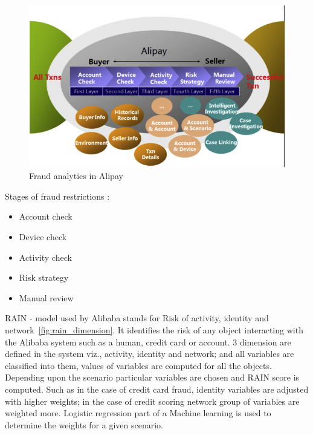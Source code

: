 \begin{figure}[H]
	\includegraphics[scale = 0.8]{figures/alipay.jpg}
	\centering
	\caption{Fraud analytics in Alipay}
	\label{fig:alipay}
\end{figure}

Stages of fraud restrictions :
\begin{itemize}
	\item Account check
	\item Device check
	\item Activity check
	\item Risk strategy 
	\item Manual review
\end{itemize}

RAIN - model used by Alibaba stands for Risk of activity, identity and network~\ref{fig:rain_dimension}. It identifies the risk of any object interacting with the Alibaba system such as a human, credit card or account. 3 dimension are defined in the system viz., activity, identity and network; and all variables are classified into them, values of variables are computed for all the objects. Depending upon the scenario particular variables are chosen and RAIN score is computed. Such as in the case of credit card fraud, identity variables are adjusted with higher weights; in the case of credit scoring network group of variables are weighted more. Logistic regression part of a Machine learning is used to determine the weights for a given scenario.

